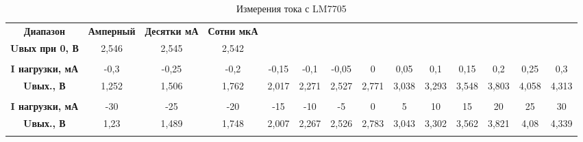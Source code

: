\begin{table}[H]
    \centering
    \caption{Измерения тока с LM7705}
    \begin{turn}{90}
      \begin{tabular}{|c|c|c|c|c|c|c|c|c|c|c|c|c|c|}
  \cline{1-4}    \textbf{Диапазон} & \textbf{Амперный} & \textbf{Десятки мА} & \textbf{Сотни мкА} & \multicolumn{1}{c}{} & \multicolumn{1}{c}{} & \multicolumn{1}{c}{} & \multicolumn{1}{c}{} & \multicolumn{1}{c}{} & \multicolumn{1}{c}{} & \multicolumn{1}{c}{} & \multicolumn{1}{c}{} & \multicolumn{1}{c}{} & \multicolumn{1}{c}{} \bigstrut\\
  \cline{1-4}    \textbf{Uвых при 0, В} & 2,546 & 2,545 & 2,542 & \multicolumn{1}{c}{} & \multicolumn{1}{c}{} & \multicolumn{1}{c}{} & \multicolumn{1}{c}{} & \multicolumn{1}{c}{} & \multicolumn{1}{c}{} & \multicolumn{1}{c}{} & \multicolumn{1}{c}{} & \multicolumn{1}{c}{} & \multicolumn{1}{c}{} \bigstrut\\
  \cline{1-4}    \multicolumn{1}{c}{} & \multicolumn{1}{c}{} & \multicolumn{1}{c}{} & \multicolumn{1}{c}{} & \multicolumn{1}{c}{} & \multicolumn{1}{c}{} & \multicolumn{1}{c}{} & \multicolumn{1}{c}{} & \multicolumn{1}{c}{} & \multicolumn{1}{c}{} & \multicolumn{1}{c}{} & \multicolumn{1}{c}{} & \multicolumn{1}{c}{} & \multicolumn{1}{c}{} \bigstrut\\
      \hline
      \textbf{I нагрузки, мА} & -0,3  & -0,25 & -0,2  & -0,15 & -0,1  & -0,05 & 0     & 0,05  & 0,1   & 0,15  & 0,2   & 0,25  & 0,3 \bigstrut\\
      \hline
      \textbf{Uвых., В} & 1,252 & 1,506 & 1,762 & 2,017 & 2,271 & 2,527 & 2,771 & 3,038 & 3,293 & 3,548 & 3,803 & 4,058 & 4,313 \bigstrut\\
      \hline
      \multicolumn{1}{c}{} & \multicolumn{1}{c}{} & \multicolumn{1}{c}{} & \multicolumn{1}{c}{} & \multicolumn{1}{c}{} & \multicolumn{1}{c}{} & \multicolumn{1}{c}{} & \multicolumn{1}{c}{} & \multicolumn{1}{c}{} & \multicolumn{1}{c}{} & \multicolumn{1}{c}{} & \multicolumn{1}{c}{} & \multicolumn{1}{c}{} & \multicolumn{1}{c}{} \bigstrut\\
      \hline
      \textbf{I нагрузки, мА} & -30   & -25   & -20   & -15   & -10   & -5    & 0     & 5     & 10    & 15    & 20    & 25    & 30 \bigstrut\\
      \hline
      \textbf{Uвых., В} & 1,23  & 1,489 & 1,748 & 2,007 & 2,267 & 2,526 & 2,783 & 3,043 & 3,302 & 3,562 & 3,821 & 4,08  & 4,339 \bigstrut\\
      \hline
      \multicolumn{1}{c}{} & \multicolumn{1}{c}{} & \multicolumn{1}{c}{} & \multicolumn{1}{c}{} & \multicolumn{1}{c}{} & \multicolumn{1}{c}{} & \multicolumn{1}{c}{} & \multicolumn{1}{c}{} & \multicolumn{1}{c}{} & \multicolumn{1}{c}{} & \multicolumn{1}{c}{} & \multicolumn{1}{c}{} & \multicolumn{1}{c}{} & \multicolumn{1}{c}{} \bigstrut\\

\end{tabular}
\end{turn}
\end{table}
